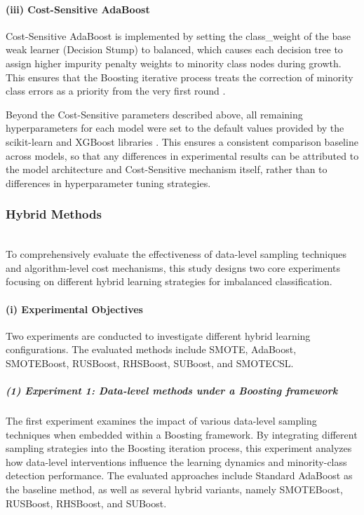 \documentclass[sigconf]{acmart}
\begin{document}
\paragraph{(iii) Cost-Sensitive AdaBoost}

 Cost-Sensitive AdaBoost is implemented by setting the class\_weight of the base weak learner (Decision Stump) to balanced, which causes each decision tree to assign higher impurity penalty weights to minority class nodes during growth. This ensures that the Boosting iterative process treats the correction of minority class errors as a priority from the very first round \cite{22}. 

Beyond the Cost-Sensitive parameters described above, all remaining hyperparameters for each model were set to the default values provided by the scikit-learn and XGBoost libraries \cite{21}. This ensures a consistent comparison baseline across models, so that any differences in experimental results can be attributed to the model architecture and Cost-Sensitive mechanism itself, rather than to differences in hyperparameter tuning strategies. 


\subsubsection{Hybrid Methods}~\\

To comprehensively evaluate the effectiveness of data-level sampling techniques and algorithm-level cost mechanisms, this study designs two core experiments focusing on different hybrid learning strategies for imbalanced classification. 

\paragraph{(i) Experimental Objectives}
Two experiments are conducted to investigate different hybrid learning configurations. The evaluated methods include SMOTE, AdaBoost, SMOTEBoost, RUSBoost, RHSBoost, SUBoost, and SMOTECSL. 

\subparagraph{(1) Experiment 1: Data-level methods under a Boosting framework}

 The first experiment examines the impact of various data-level sampling techniques when embedded within a Boosting framework. By integrating different sampling strategies into the Boosting iteration process, this experiment analyzes how data-level interventions influence the learning dynamics and minority-class detection performance. The evaluated approaches include Standard AdaBoost as the baseline method, as well as several hybrid variants, namely SMOTEBoost, RUSBoost, RHSBoost, and SUBoost. 
\end{document}
